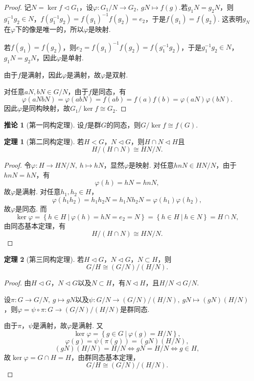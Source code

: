 \documentclass[12pt]{ctexart}
\theoremstyle{definition}
\newtheorem{theorem}{定理}
\newtheorem{corollary}{推论}
\theoremstyle{plain}
\begin{document}
	\begin{proof}
		记$N=\ker f\lhd G_1$，设$\varphi:G_1/N\to G_2,\ gN\mapsto f(g)$.若$g_1N=g_2N$，则$g_1^{-1}g_2\in N$，$f(g_1^{-1}g_2)=f(g_1)^{-1}f(g_2)=e_2$，于是$f(g_1)=f(g_2)$. 这表明$g_N$在$\varphi$下的像是唯一的，所以$\varphi$是映射.
		
		若$f(g_1)=f(g_2)$，则$e_2=f(g_1)^{-1}f(g_2)=f(g_1^{-1}g_2)$，于是$g_1^{-1}g_2\in N$，$g_1N=g_2N$，因此$\varphi$是单射.
		
		由于$f$是满射，因此$\varphi$是满射，故$\varphi$是双射.
		
		对任意$aN,bN\in G/N$，由于$f$是同态，有
		$$\varphi(aNbN)=\varphi(abN)=f(ab)=f(a)f(b)=\varphi(aN)\varphi(bN).$$
		因此$\varphi$是同构映射，故$G_1/\ker f\cong G_2$.
	\end{proof}
	\begin{corollary}[第一同构定理]
		设$f$是群$G$的同态，则$G/\ker f\cong f(G)$.
	\end{corollary}
	\begin{theorem}[第二同构定理]
		若$H<G$，$N\lhd G$，则$H\cap N\lhd H$且
		$$H/(H\cap N)\cong HN/N.$$
	\end{theorem}
	\begin{proof}
		令$\varphi:H\to HN/N,\ h\mapsto hN$，显然$\varphi$是映射. 对任意$hnN\in HN/N$，由于$hnN=hN$，有$$\varphi(h)=hN=hnN,$$故$\varphi$是满射. 对任意$h_1,h_2\in H$，
		$$\varphi(h_1h_2)=h_1h_2N=h_1Nh_2N=\varphi(h_1)\varphi(h_2),$$
		故$\varphi$是同态. 而
		$$\ker\varphi=\left\{h\in H\ |\ \varphi(h)=hN=e_2=N\right\}=\left\{h\in H\ |\ h\in N\right\}=H\cap N,$$
		由同态基本定理，有
		$$H/(H\cap N)\cong HN/N.$$
	\end{proof}
	\begin{theorem}[第三同构定理]
		若$H\lhd G$，$N\lhd G$，$N\subset H$，则
		$$G/H\cong (G/N)/(H/N).$$
	\end{theorem}
	\begin{proof}
		由$H\lhd G$，$N\lhd G$以及$N\subset H$，有$N\lhd H$，且$H/N\lhd G/N$.
		
		设$\pi:G\to G/N,\ g\mapsto gN$以及$\psi:G/N\to(G/N)/(H/N),\ gN\mapsto (gN)(H/N)$，则$\varphi=\psi\circ\pi:G\to(G/N)/(H/N)$是群同态.
		
		由于$\pi$，$\psi$是满射，故$\varphi$是满射. 又
		$$\ker\varphi=\left\{g\in G\ |\ \varphi(g)=H/N\right\},$$
		$$\varphi(g)=\psi(\pi(g))=(gN)(H/N),$$
		$$(gN)(H/N)=H/N\iff gN=H/N\iff g\in H,$$
		故$\ker\varphi=G\cap H=H$，由群同态基本定理，
		$$G/H\cong (G/N)/(H/N).$$
	\end{proof}
\end{document}
